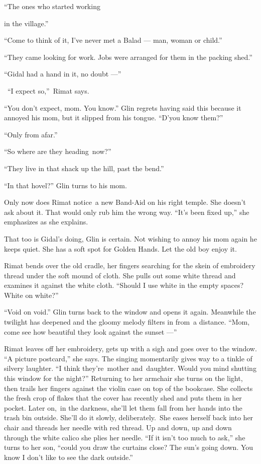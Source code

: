 \documentclass[twoside,11pt]{book}
\begin{document}
``The ones who started working{ in the village.''

{``Come to think of it, I've never met a Balad --- man,
woman }or child.''

{{}``They came looking for work. Jobs were arranged for them in the
packing }shed{.''}

{}``Gidal had a hand in it, no doubt ---''

{~``}I expect
so{,''~Rimat says. }

``You
don't expect, mom.
You know.'' Glin regrets having said
this because it annoyed his  mom, but it slipped from his tongue.
``D'you know them?''

{}``Only from afar.''

{}``So where are they heading~now?''

{{}``They live in that shack up the
hill, }past{ the bend.''}

{{}``In that hovel?'' Glin turns }to his
mom{.}

{Only now does Rimat notice~a new
B}and-Aid {on his right temple. She doesn't ask about it. T}hat would
only rub him the wrong way{. ``It's been fixed up,{}'' she emphasizes
as she explains. }

{That too is Gidal's doing, Glin is certain. Not wishing to annoy his
}mom{ again he keeps quiet. She has a soft spot for Golden Hands. Let
the }old boy {enjoy it.}

{Rimat bends over the old cradle, her fingers searching for the
}skein {of embroidery thread under the soft mound of cloth. She
pulls }out some {white thread and examines it against the white
cloth. ``Should I use white in the }empty{ spaces? White on white?''}

{{}``Void on void.{}'' Glin
}turns{ back to the window and opens it again. Meanwhile the twilight
has deepened and the gloomy melody filters in from~a distance. ``Mom, come see how beautiful they look against the
sunset ---''}

{Rimat leaves off her embroidery, gets up with a sigh and goes over to
the window. ``A picture postcard,'' she says. The singing momentarily gives way to a tinkle of silvery laughter. ``I
think they're~mother and~daughter}. Would you mind shutting this window for the
night?{{}''
}Returning{ }{to her armchair
she turns on the light, }then trails her fingers {against the violin
case on }top of{ }{the
bookcase. She collects the fresh crop of flakes that the cover has recently shed and
}puts{ them in her pocket. Later on},~in the
darkness, {she'll let them fall from her hands into the trash
bin }outside{. She'll do it slowly, deliberately.~She eases herself
back into her chair and threads her needle with red thread. Up and down, up and down }through the white calico she
{plies her needle.  ``If it
isn't}{ }{too much to
ask,'' she }turns to her son, {``could you
}draw the curtains close? The sun's going down.{ You know I don't like
to see the dark} {outside.'' }

}
\end{document}
